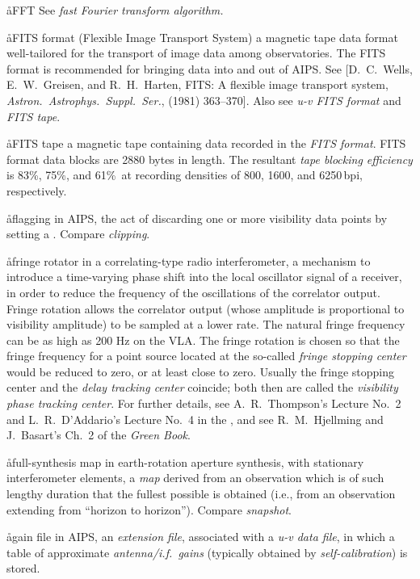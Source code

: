 \aa{FFT} See {\it fast Fourier transform algorithm.}

\aa{FITS format}
(Flexible Image Transport System) a magnetic tape data format
well-tailored for the transport of image data among observatories.
The FITS format is recommended for bringing data into and out of AIPS.
See [D.~C.~Wells, E.~W.~Greisen, and R.~H.~Harten,
FITS: A flexible image transport system,
{\it Astron.\ Astrophys.\ Suppl.\ Ser.},  (1981) 363--370].
Also see {\it u-v FITS format} and {\it FITS tape}.

\aa{FITS tape}
a magnetic tape containing data recorded in the {\it FITS format}.
FITS format data blocks are 2880 bytes in length.
The resultant {\it tape blocking efficiency} is
83\%, 75\%, and 61\%\ at recording densities of
800, 1600, and 6250\,bpi, respectively.

\aa{flagging}
in AIPS, the act of discarding one or more visibility data points
by setting a  \qv.
Compare {\it clipping}.

\aa{fringe rotator}
in a correlating-type radio interferometer,
a mechanism to introduce a time-varying phase shift
into the local oscillator signal of a receiver, in order
to reduce the frequency of the oscillations of the correlator output.
Fringe rotation allows the correlator output (whose amplitude
is proportional to visibility amplitude) to be sampled at a lower rate.
The natural fringe frequency can be as high as 200 Hz on the VLA.
The fringe rotation is chosen so that the fringe frequency for
a point source located at the so-called {\it fringe stopping center}
would be reduced to zero, or at least close to zero.
Usually the fringe stopping center and the {\it delay tracking center}
coincide;
both then are called the {\it visibility phase tracking center}.
For further details, see A.~R.~Thompson's Lecture No.~2
and L.~R.~D'Addario's Lecture No.~4 in the \sira,
and see R.~M.~Hjellming and J.~Basart's Ch.~2 of the {\it Green Book}.

\aa{full-synthesis map}
in earth-rotation aperture synthesis, with stationary interferometer
elements, a {\it map} derived from an observation which is of such
lengthy duration that the fullest possible  is
obtained (i.e., from an observation extending from ``horizon to
horizon'').
Compare {\it snapshot}.

\aa{gain file}
in AIPS, an {\it extension file}, associated with a {\it u-v data
file}, in which a table of approximate {\it antenna/i.f.\ gains}
(typically obtained by {\it self-calibration}) is stored.

